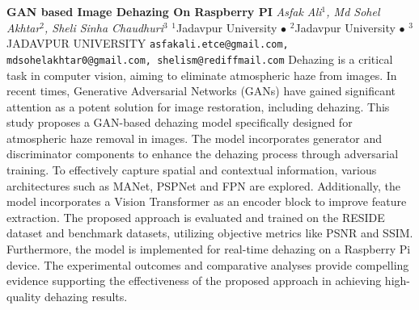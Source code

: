 
    \begin{conf-abstract}[]
        {\textbf{GAN based Image Dehazing On Raspberry PI}}
        {\textit{Asfak Ali$^{1}$, Md Sohel Akhtar$^{2}$, Sheli Sinha Chaudhuri$^{3}$}}
        {$^{1}$Jadavpur University $\bullet$ $^{2}$Jadavpur University $\bullet$ $^{3}$JADAVPUR UNIVERSITY}
        {\texttt{asfakali.etce@gmail.com, mdsohelakhtar0@gmail.com, shelism@rediffmail.com}}
        {Dehazing is a critical task in computer vision, aiming to eliminate atmospheric haze from images. In recent times, Generative Adversarial Networks (GANs) have gained significant attention as a potent solution for image restoration, including dehazing. This study proposes a GAN-based dehazing model specifically designed for atmospheric haze removal in images. The model incorporates generator and discriminator components to enhance the dehazing process through adversarial training. To effectively capture spatial and contextual information, various architectures such as MANet, PSPNet and FPN are explored. Additionally, the model incorporates a Vision Transformer as an encoder block to improve feature extraction. The proposed approach is evaluated and trained on the RESIDE dataset and benchmark datasets, utilizing objective metrics like PSNR and SSIM. Furthermore, the model is implemented for real-time dehazing on a Raspberry Pi device. The experimental outcomes and comparative analyses provide compelling evidence supporting the effectiveness of the proposed approach in achieving high-quality dehazing results.}
    \end{conf-abstract}
        